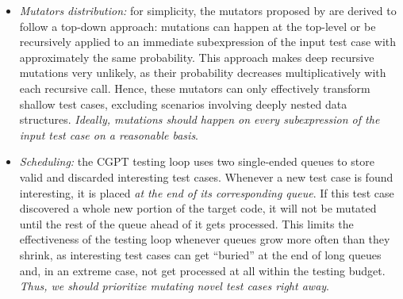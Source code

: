 \documentclass[sigconf,review,anonymous]{acmart}
\newcommand{\fuzzchick}{\textit{FuzzChick}\xspace}
\begin{document}
\begin{itemize}
\item \emph{Mutators distribution:}
%
for simplicity, the mutators proposed by \citeauthor{lampropoulos2019coverage}
are derived to follow a top-down approach:
%
mutations can happen at the top-level or be recursively applied to an immediate
subexpression of the input test case with approximately the same probability.
%
%
This approach makes deep recursive mutations very unlikely, as their probability
decreases multiplicatively with each recursive call.
%
%
%
Hence, these mutators can only effectively transform shallow test cases,
excluding scenarios involving deeply nested data structures.
%
%
\emph{Ideally, mutations should happen on every subexpression of the input test
  case on a reasonable basis}.


%


\item \emph{Scheduling:}
%
the CGPT testing loop uses two single-ended queues to store valid and discarded
interesting test cases.
%
Whenever a new test case is found interesting, it is placed \emph{at the end of
  its corresponding queue}.
%
If this test case discovered a whole new portion of the target code, it will not
be mutated until the rest of the queue ahead of it gets processed.
%
This limits the effectiveness of the testing loop whenever queues grow more
often than they shrink, as interesting test cases can get ``buried'' at the end
of long queues and,
%
%
in an extreme case, not get processed at all within the testing budget.
%
\emph{Thus, we should prioritize mutating novel test cases right away}.
%
%


\end{itemize}
\end{document}
